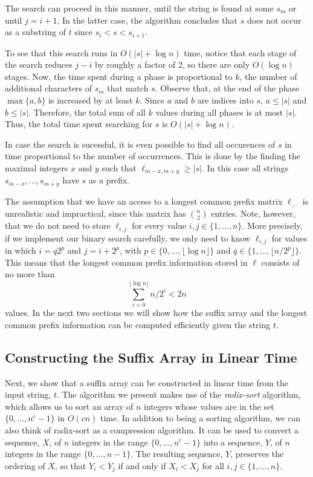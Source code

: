 The search can proceed in this manner, until the string is found at some
$s_m$ or until $j = i+1$. In the latter case, the algorithm concludes
that $s$ does not occur as a substring of $t$ since $s_{i} <s <s_{i+1}$.

To see that this search runs in $O(|s|+\log n)$ time, notice that each stage of the search reduces $j-i$ by roughly a factor of 2, so there are only $O(\log n)$ stages.  Now, the time spent during a phase is proportional to $k$, the number of additional characters of $s_m$ that match $s$.  Observe that, at the end of the phase $\max\{a,b\}$ is increased by at least $k$.  Since $a$ and $b$ are indices into $s$, $a\le|s|$ and $b\le|s|$. Therefore, the total sum of all $k$ values during all phases is at most $|s|$.  Thus, the total time spent searching for $s$ is $O(|s|+\log n)$.

In case the search is sucessful, it is even possible to find all
occurences of $s$ in time proportional to the number of occurrences.
This is done by the finding the maximal integers $x$ and $y$
such that $\ell_{m-x,m+y} \ge |s|$.  In this case all strings
$s_{m-x},\ldots,s_{m+y}$ have $s$ as a prefix.

The assumption that we have an access to a longest common prefix
matrix $\ell_{\cdot,\cdot}$ is unrealistic and impractical, since
this matrix has $\binom{n}{2}$ entries.  Note, however, that we do
not need to store $\ell_{i,j}$ for every value $i,j\in\{1,\ldots,n\}$.
More precisely, if we implement our binary search carefully, we only
need to know $\ell_{i,j}$ for values in which $i=q2^p$ and $j=i+2^{p}$,
with $p\in\{0,\ldots,\lfloor \log n\rfloor\}$ and $q\in\{1,\ldots,\lfloor
n/2^p\rfloor\}$. This means that the longest common prefix information
stored in $\ell$ consists of no more than
\[
  \sum_{i=0}^{\lfloor\log n\rfloor} n/2^i < 2n
\]
values.  In the next two sections we will show how the suffix array and the longest common prefix information can be computed efficiently given the string $t$.

\subsection{Constructing the Suffix Array in Linear Time}

Next, we show that a suffix array can be constructed in linear time
from the input string, $t$.  The algorithm we present makes use of the
\emph{radix-sort} algorithm, which allows us to sort an array of $n$
integers whose values are in the set $\{0,\ldots,n^c-1\}$ in $O(cn)$
time. In addition to being a sorting algorithm, we can also think of
radix-sort as a compression algorithm.  It can be used to convert
a sequence, $X$, of $n$ integers in the range $\{0,\ldots,n^c-1\}$
into a sequence, $Y$, of $n$ integers in the range $\{0,\ldots,n-1\}$.
The resulting sequence, $Y$, preserves the ordering of $X$, so that
$Y_i<Y_j$ if and only if $X_i<X_j$ for all $i,j\in\{1,\ldots,n\}$.

